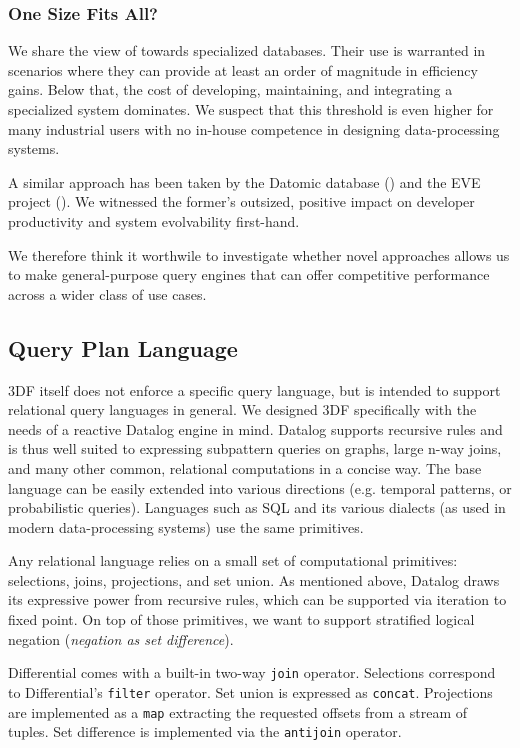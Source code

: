 \documentclass[../index.tex]{subfiles}
\begin{document}
\subsubsection{One Size Fits All?}

We share the view of \cite{aref2015design} towards specialized
databases. Their use is warranted in scenarios where they can provide
at least an order of magnitude in efficiency gains. Below that, the
cost of developing, maintaining, and integrating a specialized system
dominates. We suspect that this threshold is even higher for many
industrial users with no in-house competence in designing
data-processing systems.

A similar approach has been taken by the Datomic database
(\cite{datomic}) and the EVE project (\cite{eve}). We witnessed the
former's outsized, positive impact on developer productivity and
system evolvability first-hand.

We therefore think it worthwile to investigate whether novel
approaches allows us to make general-purpose query engines that can
offer competitive performance across a wider class of use cases.

\subsection{Query Plan Language}

3DF itself does not enforce a specific query language, but is intended
to support relational query languages in general. We designed 3DF
specifically with the needs of a reactive Datalog engine in
mind. Datalog supports recursive rules and is thus well suited to
expressing subpattern queries on graphs, large n-way joins, and many
other common, relational computations in a concise way. The base
language can be easily extended into various directions (e.g. temporal
patterns, or probabilistic queries). Languages such as SQL and its
various dialects (as used in modern data-processing systems) use the
same primitives.

Any relational language relies on a small set of computational
primitives: selections, joins, projections, and set union. As
mentioned above, Datalog draws its expressive power from recursive
rules, which can be supported via iteration to fixed point. On top of
those primitives, we want to support stratified logical negation
(\emph{negation as set difference}).

Differential comes with a built-in two-way \texttt{join}
operator. Selections correspond to Differential's \texttt{filter}
operator. Set union is expressed as \texttt{concat}. Projections are
implemented as a \texttt{map} extracting the requested offsets from a
stream of tuples. Set difference is implemented via the
\texttt{antijoin} operator.
\end{document}
